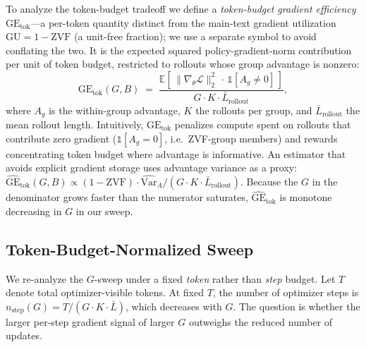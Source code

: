\documentclass{article}
\begin{document}
To analyze the token-budget tradeoff we define a \emph{token-budget gradient
efficiency} $\mathrm{GE}_{\text{tok}}$---a per-token quantity distinct from the
main-text gradient utilization $\mathrm{GU}{=}1{-}\mathrm{ZVF}$ (a unit-free
fraction); we use a separate symbol to avoid conflating the two. It is the
expected squared policy-gradient-norm contribution per unit of token budget,
restricted to rollouts whose group advantage is nonzero:
\begin{equation}
\label{eq:gu}
\mathrm{GE}_{\text{tok}}(G, B) \;=\;
\frac{\displaystyle\mathbb{E}\!\left[\,\|\nabla_\theta \mathcal{L}\|_2^{2}\,\cdot\,
  \mathbb{1}\!\left[A_g \ne 0\right]\,\right]}
{\displaystyle G \cdot K \cdot \bar{L}_\text{rollout}},
\end{equation}
where $A_g$ is the within-group advantage, $K$ the rollouts per group,
and $\bar{L}_\text{rollout}$ the mean rollout length.
Intuitively, $\mathrm{GE}_{\text{tok}}$ penalizes compute spent on rollouts that
contribute zero gradient ($\mathbb{1}[A_g\!=\!0]$, i.e.~ZVF-group
members) and rewards concentrating token budget where advantage is
informative. An estimator that avoids explicit gradient storage uses
advantage variance as a proxy:
$\widehat{\mathrm{GE}}_{\text{tok}}(G,B) \!\propto\!
 (1 - \mathrm{ZVF}) \cdot \widehat{\mathrm{Var}}_A / (G\cdot K \cdot \bar{L}_\text{rollout})$.
Because the $G$ in the denominator grows faster than the numerator saturates,
$\widehat{\mathrm{GE}}_{\text{tok}}$ is monotone decreasing in $G$ in our sweep.

\subsection{Token-Budget-Normalized Sweep}

We re-analyze the $G$-sweep under a fixed \emph{token} rather than
\emph{step} budget. Let $T$ denote total optimizer-visible tokens.
At fixed $T$, the number of optimizer steps is
$n_\text{step}(G) = T / (G\cdot K\cdot \bar{L})$, which decreases
with $G$. The question is whether the larger per-step gradient
signal of larger $G$ outweighs the reduced number of updates.
\end{document}

